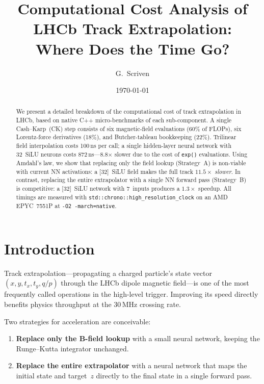 \documentclass[11pt,a4paper]{article}
\title{Computational Cost Analysis of LHCb Track Extrapolation:\\
       Where Does the Time Go?}
\author{G.\ Scriven}
\date{\today}
\newcommand{\SI}[2]{#1\,#2}
\begin{document}
\maketitle

\begin{abstract}
    We present a detailed breakdown of the computational cost of
    track extrapolation in LHCb, based on native C++ micro-benchmarks
    of each sub-component.  A single Cash--Karp~(CK) step consists of
    six magnetic-field evaluations (60\% of FLOPs), six Lorentz-force
    derivatives (18\%), and Butcher-tableau bookkeeping (22\%).
    Trilinear field interpolation costs \SI{100}{ns} per call; a
    single hidden-layer neural network with 32~SiLU neurons costs
    \SI{872}{ns}---8.8$\times$ slower due to the cost of
    \texttt{exp()} evaluations.  Using Amdahl's law, we show that
    replacing only the field lookup (Strategy~A) is non-viable with
    current NN activations: a [32]~SiLU field makes the full track
    $11.5\times$ \emph{slower}.  In contrast, replacing the entire
    extrapolator with a single NN forward pass (Strategy~B) is
    competitive: a [32]~SiLU network with 7~inputs produces a
    $1.3\times$ speedup.  All timings are measured with
    \texttt{std::chrono::high\_resolution\_clock} on an AMD EPYC~7551P
    at \texttt{-O2 -march=native}.
\end{abstract}

\tableofcontents
\newpage

\section{Introduction}
\label{sec:intro}

Track extrapolation---propagating a charged particle's state vector
$(x, y, t_x, t_y, q/p)$ through the LHCb dipole magnetic field---is
one of the most frequently called operations in the high-level trigger.
Improving its speed directly benefits physics throughput at the
\SI{30}{MHz} crossing rate.

Two strategies for acceleration are conceivable:
\begin{enumerate}
    \item[\textbf{A.}] \textbf{Replace only the B-field lookup}
        with a small neural network, keeping the Runge--Kutta
        integrator unchanged.
    \item[\textbf{B.}] \textbf{Replace the entire extrapolator}
        with a neural network that maps the initial state and
        target~$z$ directly to the final state in a single forward pass.
\end{enumerate}
\end{document}
